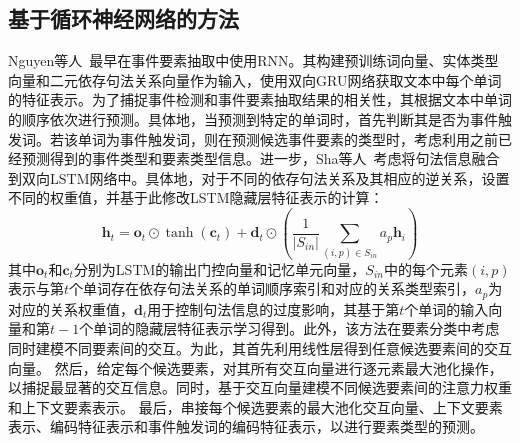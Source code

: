 \subsection{基于循环神经网络的方法}
Nguyen等人~\cite{nguyen2016joint}最早在事件要素抽取中使用RNN。其构建预训练词向量、实体类型向量和二元依存句法关系向量作为输入，使用双向GRU网络获取文本中每个单词的特征表示。为了捕捉事件检测和事件要素抽取结果的相关性，其根据文本中单词的顺序依次进行预测。具体地，当预测到特定的单词时，首先判断其是否为事件触发词。若该单词为事件触发词，则在预测候选事件要素的类型时，考虑利用之前已经预测得到的事件类型和要素类型信息。进一步，Sha等人~\cite{sha2018jointly}考虑将句法信息融合到双向LSTM网络中。具体地，对于不同的依存句法关系及其相应的逆关系，设置不同的权重值，并基于此修改LSTM隐藏层特征表示的计算：
\begin{equation}
    \boldsymbol{h}_t=\boldsymbol{o}_t \odot \tanh \left(\boldsymbol{c}_t\right)+\boldsymbol{d}_t \odot\left(\frac{1}{\left|S_{i n}\right|} \sum_{(i, p) \in S_{i n}} a_p \boldsymbol{h}_i\right)
\end{equation}
其中$\boldsymbol{o}_t$和$\boldsymbol{c}_t$分别为LSTM的输出门控向量和记忆单元向量，$S_{i n}$中的每个元素$(i, p)$表示与第$t$个单词存在依存句法关系的单词顺序索引和对应的关系类型索引，$a_{p}$为对应的关系权重值，$\boldsymbol{d}_{t}$用于控制句法信息的过度影响，其基于第$t$个单词的输入向量和第$t-1$个单词的隐藏层特征表示学习得到。此外，该方法在要素分类中考虑同时建模不同要素间的交互。为此，其首先利用线性层得到任意候选要素间的交互向量。
然后，给定每个候选要素，对其所有交互向量进行逐元素最大池化操作，以捕捉最显著的交互信息。同时，基于交互向量建模不同候选要素间的注意力权重和上下文要素表示。
最后，串接每个候选要素的最大池化交互向量、上下文要素表示、编码特征表示和事件触发词的编码特征表示，以进行要素类型的预测。

